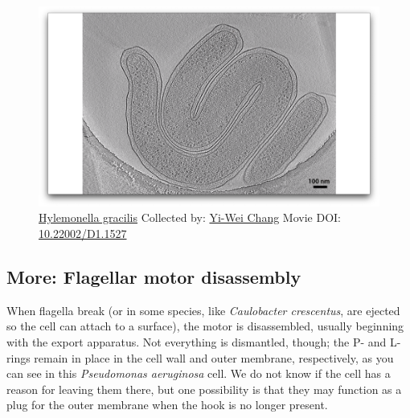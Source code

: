 \documentclass[]{tufte-book}
\begin{document}
\begin{figure}
\includegraphics{movie_stills/6_3} \caption[\protect\hyperlink{tree}{Hylemonella gracilis} Collected by:
\protect\hyperlink{yi-wei_chang}{Yi-Wei Chang} Movie DOI:
\href{https://doi.org/10.22002/D1.1527}{10.22002/D1.1527}]{\protect\hyperlink{tree}{Hylemonella gracilis} Collected by:
\protect\hyperlink{yi-wei_chang}{Yi-Wei Chang} Movie DOI:
\href{https://doi.org/10.22002/D1.1527}{10.22002/D1.1527}}\label{fig:6-3}
\end{figure}

\hypertarget{Flagellar_motor_disassembly}{\subsection*{More: Flagellar
motor disassembly}\label{Flagellar_motor_disassembly}}

When flagella break (or in some species, like \emph{Caulobacter
crescentus}, are ejected so the cell can attach to a surface), the motor
is disassembled, usually beginning with the export apparatus. Not
everything is dismantled, though; the P- and L-rings remain in place in
the cell wall and outer membrane, respectively, as you can see in this
\emph{Pseudomonas aeruginosa} cell. We do not know if the cell has a
reason for leaving them there, but one possibility is that they may
function as a plug for the outer membrane when the hook is no longer
present.
\end{document}
